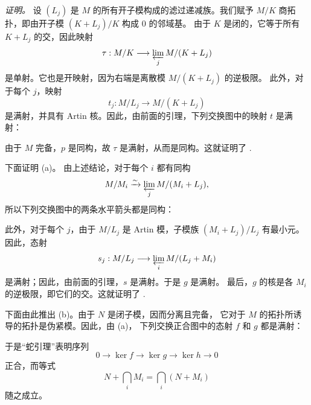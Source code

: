 
\medskip
\noindent\textit{证明。}
\label{sga3:VIIB:0.2.D-proof}
设 \((L_j)\) 是 \(M\) 的所有开子模构成的滤过递减族。我们赋予 \(M/K\)
商拓扑，即由开子模 \((K+L_j)/K\) 构成 \(0\) 的邻域基。
由于 \(K\) 是闭的，它等于所有 \(K+L_j\) 的交，因此映射
\[
  \tau:M/K\longrightarrow\varprojlim_j M/(K+L_j)
\]
是单射。它也是开映射，因为右端是离散模 \(M/(K+L_j)\) 的逆极限。
此外，对于每个 \(j\)，映射
\[
  t_j:M/L_j\longrightarrow M/(K+L_j)
\]
是满射，并具有 Artin 核。因此，由前面的引理，下列交换图中的映射 \(t\) 是满射：
\begin{center}
  \label{sga3:VIIB:0.2.D-quotient-completion-square}
  
\end{center}
由于 \(M\) 完备，\(p\) 是同构，故 \(\tau\) 是满射，从而是同构。这就证明了
\textup{}.

\label{sga3:VIIB:0.2.D-proof-ii-a}
下面证明 \textup{(a)}。
由上述结论，对于每个 \(i\) 都有同构
\[
  M/M_i\xrightarrow{\sim}\varprojlim_j M/(M_i+L_j),
\]
所以下列交换图中的两条水平箭头都是同构：
\begin{center}
  \label{sga3:VIIB:0.2.D-filtered-family-square}
  
\end{center}
此外，对于每个 \(j\)，由于 \(M/L_j\) 是 Artin 模，子模族
\((M_i+L_j)/L_j\) 有最小元。因此，态射
\[
  s_j:M/L_j\longrightarrow\varprojlim_i M/(L_j+M_i)
\]
是满射；因此，由前面的引理，\(s\) 是满射。于是 \(g\) 是满射。
最后，\(g\) 的核是各 \(M_i\) 的逆极限，即它们的交。这就证明了 \textup{}.

\label{sga3:VIIB:0.2.D-proof-ii-b}
下面由此推出 \textup{(b)}。由于 \(N\) 是闭子模，因而分离且完备，
它对于 \(M\) 的拓扑所诱导的拓扑是伪紧模。因此，由 \textup{(a)}，
下列交换正合图中的态射 \(f\) 和 \(g\) 都是满射：
\begin{center}
  \label{sga3:VIIB:0.2.D-snake-exact-diagram}
  
\end{center}
于是“蛇引理”表明序列
\[
  0\longrightarrow\ker f\longrightarrow\ker g
  \longrightarrow\ker h\longrightarrow 0
\]
正合，而等式
\[
  N+\bigcap_i M_i=\bigcap_i(N+M_i)
\]
随之成立。

